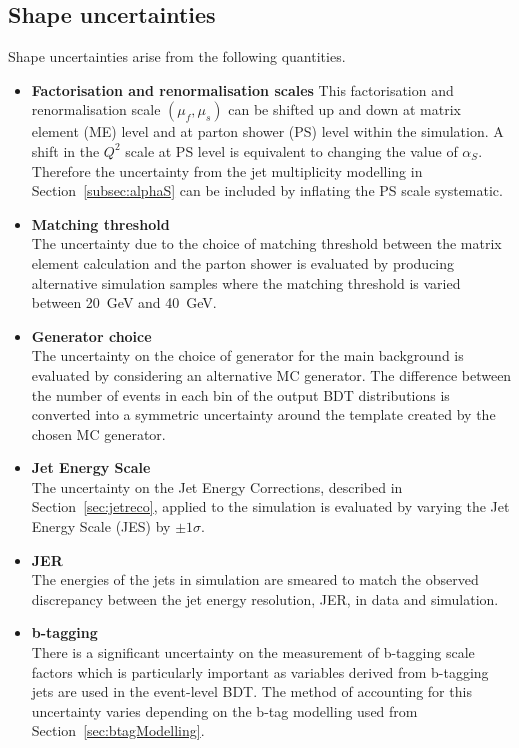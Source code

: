 \subsection{Shape uncertainties}
 Shape uncertainties arise from the following quantities.
\begin{itemize}
\item \textbf{Factorisation and renormalisation scales}
This factorisation and renormalisation scale $\left(\mu_{f},\mu_{s}\right)$ can be shifted up and down at matrix element (ME) level and at parton shower (PS) level within the simulation. A shift in the $Q^{2}$ scale at PS level is equivalent to changing the value of $\alpha_{S}$. Therefore the uncertainty from the jet multiplicity modelling in Section~\ref{subsec:alphaS} can be included by inflating the PS scale systematic.

\item \textbf{Matching threshold}\\
The uncertainty due to the choice of matching threshold between the matrix element calculation and the parton shower is evaluated by producing alternative simulation samples where the matching threshold is varied between 20~GeV and 40~GeV.

\item \textbf{Generator choice}\\
The uncertainty on the choice of generator for the main \ttbar background is evaluated by considering an alternative \ttbar MC generator. The difference between the number of events in each bin of the output BDT distributions is converted into a symmetric uncertainty around the template created by the chosen MC generator.

\item \textbf{Jet Energy Scale}\\
The uncertainty on the Jet Energy Corrections, described in Section~\ref{sec:jetreco}, applied to the simulation is evaluated by varying the Jet Energy Scale (JES) by $\pm 1\sigma$.

\item \textbf{JER}\\
The energies of the jets in simulation are smeared to match the observed discrepancy between the jet energy resolution, JER, in data and simulation. 

\item \textbf{b-tagging}\\
There is a significant uncertainty on the measurement of b-tagging scale factors which is particularly important as variables derived from b-tagging jets are used in the event-level BDT. The method of accounting for this uncertainty varies depending on the b-tag modelling used from Section~\ref{sec:btagModelling}.


\end{itemize}
